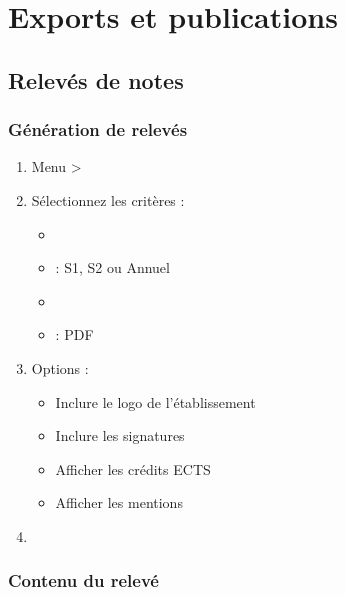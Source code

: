 \section{Exports et publications}

\subsection{Relevés de notes}

\subsubsection{Génération de relevés}

\begin{enumerate}[leftmargin=*]
    \item Menu  > 
    \item Sélectionnez les critères :
    \begin{itemize}
        \item {}
        \item {} : S1, S2 ou Annuel
        \item {}
        \item {} : PDF
    \end{itemize}
    \item Options :
    \begin{itemize}
        \item Inclure le logo de l'établissement
        \item Inclure les signatures
        \item Afficher les crédits ECTS
        \item Afficher les mentions
    \end{itemize}
    \item {}
\end{enumerate}

\subsubsection{Contenu du relevé}


